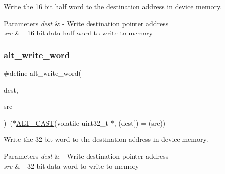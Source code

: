 Write the 16 bit half word to the destination address in device memory. 
\begin{DoxyParams}{Parameters}
{\em dest} & -\/ Write destination pointer address \\
\hline
{\em src} & -\/ 16 bit data half word to write to memory \\
\hline
\end{DoxyParams}
\mbox{\label{group__ALT__SOCAL__UTIL__RW__FUNC_gac135ea12921af3aeb033c92ddb82c66c}} 
\subsubsection{\texorpdfstring{alt\_write\_word}{alt\_write\_word}}
{\footnotesize\ttfamily \#define alt\+\_\+write\+\_\+word(\begin{DoxyParamCaption}\item[{}]{dest,  }\item[{}]{src }\end{DoxyParamCaption})~($\ast$\mbox{\hyperlink{group__ALT__SOCAL__UTIL_ga0c0d803769fc22ce2c319fc475febbde}{A\+L\+T\+\_\+\+C\+A\+ST}}(volatile uint32\+\_\+t $\ast$, (dest)) = (src))}

Write the 32 bit word to the destination address in device memory. 
\begin{DoxyParams}{Parameters}
{\em dest} & -\/ Write destination pointer address \\
\hline
{\em src} & -\/ 32 bit data word to write to memory \\
\hline
\end{DoxyParams}
